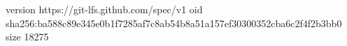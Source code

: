 version https://git-lfs.github.com/spec/v1
oid sha256:ba588c89e345e0b1f7285af7c8ab54b8a51a157ef30300352cba6c2f4f2b3bb0
size 18275
